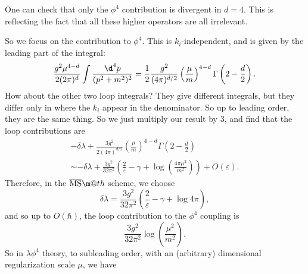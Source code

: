 \documentclass[a4paper]{article}
\makeatletter
\newcommand*{\textoverline}[1]{$\overline{\hbox{#1}}\m@th$}
\makeatother
\begin{document}
One can check that only the $\phi^4$ contribution is divergent in $d = 4$. This is reflecting the fact that all these higher operators are all irrelevant.

So we focus on the contribution to $\phi^4$. This is $k_i$-independent, and is given by the leading part of the integral:
\[
  \frac{g^2 \mu^{4 - d}}{2(2\pi)^d} \int \frac{\d^4 p}{(p^2 + m^2)^2} = \frac{1}{2} \frac{g^2}{(4\pi)^{d/2}} \left(\frac{\mu}{m}\right)^{4 - d} \Gamma\left(2 - \frac{d}{2}\right).
\]
How about the other two loop integrals? They give different integrals, but they differ only in where the $k_i$ appear in the denominator. So up to leading order, they are the same thing. So we just multiply our result by $3$, and find that the loop contributions are
\begin{multline*}
  - \delta \lambda + \frac{3 g^2}{2(4\pi)^{d/2}} \left(\frac{\mu}{m}\right)^{4 - d} \Gamma\left(2 - \frac{d}{2}\right) \\
  \sim - \delta \lambda + \frac{3g^2}{32 \pi^2} \left(\frac{2}{\varepsilon} - \gamma + \log\left(\frac{4 \pi \mu^2}{m^2}\right)\right) + O(\varepsilon).
\end{multline*}
Therefore, in the \textoverline{MS} scheme, we choose
\[
  \delta \lambda = \frac{3g^2}{32 \pi^2}\left(\frac{2}{\varepsilon} - \gamma + \log 4\pi\right),
\]
and so up to $O(\hbar)$, the loop contribution to the $\phi^4$ coupling is
\[
  \frac{3g^2}{32 \pi^2} \log \left(\frac{\mu^2}{m^2}\right).
\]
%
So in $\lambda \phi^4$ theory, to subleading order, with an (arbitrary) dimensional regularization scale $\mu$, we have %
\end{document}
